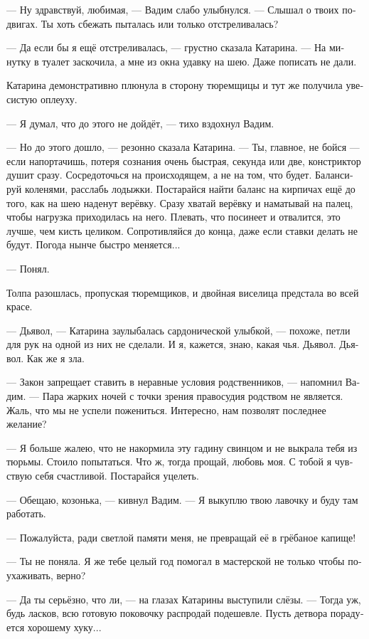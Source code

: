 \documentclass[a4paper,12pt,fleqn]{book}\usepackage{polyglossia}\setdefaultlanguage[babelshorthands=true]{russian}\setotherlanguage{english}\defaultfontfeatures{Ligatures=TeX,Mapping=tex-text}\usepackage{xcolor}\newcommand{\ml}[3]{#2}
\begin{document}
--- Ну здравствуй, любимая, --- Вадим слабо улыбнулся.
--- Слышал о твоих подвигах.
Ты хоть сбежать пыталась или только отстреливалась?

--- Да если бы я ещё отстреливалась, --- грустно сказала Катарина.
--- На минутку в туалет заскочила, а мне из окна удавку на шею.
Даже пописать не дали.

Катарина демонстративно плюнула в сторону тюремщицы и тут же получила увесистую оплеуху.

--- Я думал, что до этого не дойдёт, --- тихо вздохнул Вадим.

--- Но до этого дошло, --- резонно сказала Катарина.
--- Ты, главное, не бойся --- если напортачишь, потеря сознания очень быстрая, секунда или две, констриктор душит сразу.
Сосредоточься на происходящем, а не на том, что будет.
Балансируй коленями, расслабь лодыжки.
Постарайся найти баланс на кирпичах ещё до того, как на шею наденут верёвку.
Сразу хватай верёвку и наматывай на палец, чтобы нагрузка приходилась на него.
Плевать, что посинеет и отвалится, это лучше, чем кисть целиком.
Сопротивляйся до конца, даже если ставки делать не будут.
Погода нынче быстро меняется...

--- Понял.

Толпа разошлась, пропуская тюремщиков, и двойная виселица предстала во всей красе.

--- Дьявол, --- Катарина заулыбалась сардонической улыбкой, --- похоже, петли для рук на одной из них не сделали.
И я, кажется, знаю, какая чья.
Дьявол.
Дьявол.
Как же я зла.

--- Закон запрещает ставить в неравные условия родственников, --- напомнил Вадим.
--- Пара жарких ночей с точки зрения правосудия родством не является.
Жаль, что мы не успели пожениться.
Интересно, нам позволят последнее желание?

--- Я больше жалею, что не накормила эту гадину свинцом и не выкрала тебя из тюрьмы.
Стоило попытаться.
Что ж, тогда прощай, любовь моя.
С тобой я чувствую себя счастливой.
Постарайся уцелеть.

\ml{$0$}
{--- Обещаю, козонька, --- кивнул Вадим.}
{``I promise, goaty,'' Wadim nodded.}
--- Я выкуплю твою лавочку и буду там работать.

--- Пожалуйста, ради светлой памяти меня, не превращай её в грёбаное капище!

--- Ты не поняла.
Я же тебе целый год помогал в мастерской не только чтобы поухаживать, верно?

--- Да ты серьёзно, что ли, --- на глазах Катарины выступили слёзы.
--- Тогда уж, будь ласков, всю готовую поковочку распродай подешевле.
Пусть детвора порадуется хорошему хуку...
\end{document}
